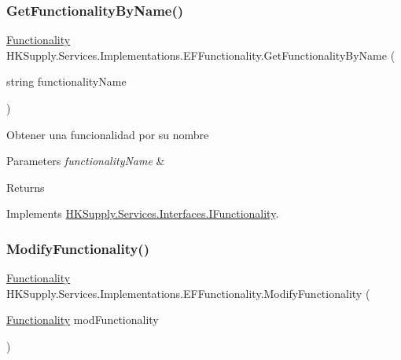 \subsubsection{\texorpdfstring{Get\+Functionality\+By\+Name()}{GetFunctionalityByName()}}
{\footnotesize\ttfamily \mbox{\hyperlink{class_h_k_supply_1_1_models_1_1_functionality}{Functionality}} H\+K\+Supply.\+Services.\+Implementations.\+E\+F\+Functionality.\+Get\+Functionality\+By\+Name (\begin{DoxyParamCaption}\item[{string}]{functionality\+Name }\end{DoxyParamCaption})}



Obtener una funcionalidad por su nombre 


\begin{DoxyParams}{Parameters}
{\em functionality\+Name} & \\
\hline
\end{DoxyParams}
\begin{DoxyReturn}{Returns}

\end{DoxyReturn}


Implements \mbox{\hyperlink{interface_h_k_supply_1_1_services_1_1_interfaces_1_1_i_functionality}{H\+K\+Supply.\+Services.\+Interfaces.\+I\+Functionality}}.

\mbox{\label{class_h_k_supply_1_1_services_1_1_implementations_1_1_e_f_functionality_ae4f83037cd6ef526f55de1a2ba442cc6}} 
\subsubsection{\texorpdfstring{Modify\+Functionality()}{ModifyFunctionality()}}
{\footnotesize\ttfamily \mbox{\hyperlink{class_h_k_supply_1_1_models_1_1_functionality}{Functionality}} H\+K\+Supply.\+Services.\+Implementations.\+E\+F\+Functionality.\+Modify\+Functionality (\begin{DoxyParamCaption}\item[{\mbox{\hyperlink{class_h_k_supply_1_1_models_1_1_functionality}{Functionality}}}]{mod\+Functionality }\end{DoxyParamCaption})}



